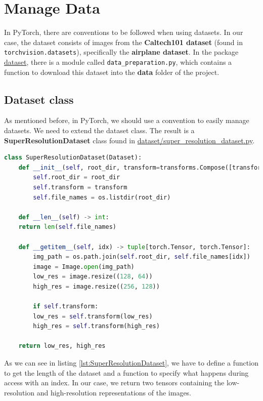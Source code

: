 \documentclass[../report.tex]{subfiles}
\begin{document}
	
\section{Manage Data}

In PyTorch, there are conventions to be followed when using datasets. In our case, the dataset consists of images from the \textbf{Caltech101 dataset} (found in \texttt{torchvision.datasets}), specifically the \textbf{airplane dataset}. In the package \href{https://github.com/cMancio00/Super-Resolution/blob/main/dataset/data_preparation.py}{dataset}, there is a module called \texttt{data\_preparation.py}, which contains a function to download this dataset into the \textbf{data} folder of the project.

\subsection{Dataset class}

As mentioned before, in PyTorch, we should use a convention to easily manage datasets. We need to extend the dataset class. The result is a \textbf{SuperResolutionDataset} class found in \href{https://github.com/cMancio00/Super-Resolution/blob/main/dataset/super_resolution_dataset.py}{dataset/super\_resolution\_dataset.py}.

\begin{lstlisting}[style=python, language=python, label={lst:SuperResolutionDataset}, caption={SuperResolutionDataset}]
class SuperResolutionDataset(Dataset):
	def __init__(self, root_dir, transform=transforms.Compose([transforms.ToTensor()])) -> None:
		self.root_dir = root_dir
		self.transform = transform
		self.file_names = os.listdir(root_dir)

	def __len__(self) -> int:
	return len(self.file_names)

	def __getitem__(self, idx) -> tuple[torch.Tensor, torch.Tensor]:
		img_path = os.path.join(self.root_dir, self.file_names[idx])
		image = Image.open(img_path)
		low_res = image.resize((128, 64))
		high_res = image.resize((256, 128))
	
		if self.transform:
		low_res = self.transform(low_res)
		high_res = self.transform(high_res)
		
	return low_res, high_res
\end{lstlisting}
As we can see in listing \ref{lst:SuperResolutionDataset}, we have to define a function to get the length of the dataset and a function to specify what happens during access with an index. In our case, we return two tensors containing the low-resolution and high-resolution representations of the images.
\end{document}
